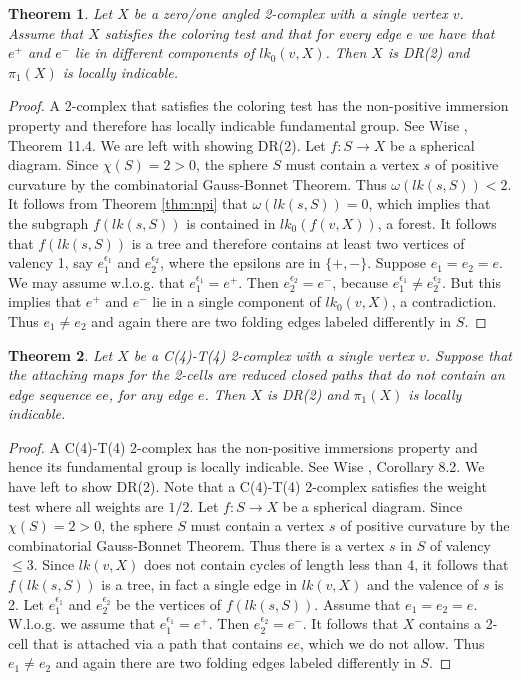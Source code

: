 \documentclass[12pt]{amsart}
\newtheorem{thm}{Theorem}[section]
\theoremstyle{definition}
\begin{document}
\begin{thm}\label{thm:DR(2)zo} Let $X$ be a zero/one angled 2-complex with a single vertex $v$. Assume that $X$ satisfies the coloring test and that for every edge $e$ we have that $e^+$ and $e^-$ lie in different components of $lk_0(v,X)$. Then $X$ is DR(2) and $\pi_1(X)$ is locally indicable.
\end{thm}

\begin{proof} A 2-complex that satisfies the coloring test has the non-positive immersion property and therefore has locally indicable fundamental group. See Wise \cite{Wise04}, Theorem 11.4. We are left with showing DR(2). Let $f\colon S\to X$ be a spherical diagram. Since $\chi(S)=2>0$, the sphere $S$ must contain a vertex $s$ of positive curvature by the combinatorial Gauss-Bonnet Theorem. Thus $\omega(lk(s,S))< 2$. It follows from Theorem \ref{thm:npi} that $\omega(lk(s,S))=0$, which implies that the subgraph $f(lk(s,S))$ is contained in $lk_0(f(v,X))$, a forest. It follows that $f(lk(s,S))$ is a tree and therefore contains at least two vertices of valency 1, say $e_1^{\epsilon_1}$ and $e_2^{\epsilon_2}$, where the epsilons are in $\{ +, -\}$. Suppose $e_1=e_2=e$. We may assume w.l.o.g. that $e_1^{\epsilon_1}=e^+$. Then $e_2^{\epsilon_2}=e^-$, because $e_1^{\epsilon_1}\ne e_2^{\epsilon_2}$. But this implies that $e^+$ and $e^-$ lie in a single component of $lk_0(v,X)$, a contradiction. Thus $e_1\ne e_2$ and again there are two folding edges labeled differently in $S$.
\end{proof}


\begin{thm}\label{thm:DR(2)44}
    Let $X$ be a C(4)-T(4) 2-complex with a single vertex $v$. Suppose that the attaching maps for the 2-cells are reduced closed paths that do not contain an edge sequence $ee$, for any edge $e$. Then $X$ is DR(2) and $\pi_1(X)$ is locally indicable.
\end{thm}

\begin{proof}
    A C(4)-T(4) 2-complex has the non-positive immersions property and hence its fundamental group is locally indicable. See Wise \cite{Wise22}, Corollary 8.2. We have left to show DR(2). Note that a C(4)-T(4) 2-complex satisfies the weight test where all weights are $1/2$. Let $f\colon S\to X$ be a spherical diagram. Since $\chi(S)=2>0$, the sphere $S$ must contain a vertex $s$ of positive curvature by the combinatorial Gauss-Bonnet Theorem. Thus there is a vertex $s$ in $S$ of valency $\le 3$. Since $lk(v,X)$ does not contain cycles of length less than 4, it follows that $f(lk(s,S))$ is a tree, in fact a single edge in $lk(v,X)$ and the valence of $s$ is 2. Let $e_1^{\epsilon_1}$ and $e_2^{\epsilon_2}$ be the vertices of $f(lk(s,S))$. Assume that $e_1=e_2=e$. W.l.o.g. we assume that $e_1^{\epsilon_1}=e^+$. Then $e_2^{\epsilon_2}=e^-$. It follows that $X$ contains a 2-cell that is attached via a path that contains $ee$, which we do not allow. Thus $e_1\ne e_2$ and again there are two folding edges labeled differently in $S$.
\end{proof}
\end{document}
